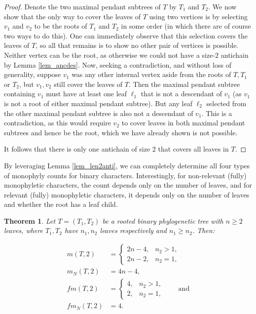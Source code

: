 \documentclass{amsart}
\newtheorem{theorem}{Theorem}
\theoremstyle{definition}
\begin{document}
\begin{proof}
 Denote the two maximal pendant subtrees of $T$ by $T_1$ and $T_2$. We now show that the only way to cover the leaves of $T$ using two vertices is by selecting $v_1$ and $v_2$ to be the roots of $T_1$ and $T_2$ in some order (in which there are of course two ways to do this). One can immediately observe that this selection covers the leaves of $T$, so all that remains is to show no other pair of vertices is possible. Neither vertex can be the root, as otherwise we could not have a size-$2$ antichain by Lemma \ref{lem_ancdes}. Now, seeking a contradiction, and without loss of generality, suppose $v_1$ was any other internal vertex aside from the roots of $T,T_1$ or $T_2$, but $v_1,v_2$ still cover the leaves of $T$. Then the maximal pendant subtree containing $v_1$ must have at least one leaf $\ell_1$ that is not a descendant of $v_1$ (as $v_1$ is not a root of either maximal pendant subtree). But any leaf $\ell_2$ selected from the other maximal pendant subtree is also not a descendant of $v_1$. This is a contradiction, as this would require $v_2$ to cover leaves in both maximal pendant subtrees and hence be the root, which we have already shown is not possible.

It follows that there is only one antichain of size $2$ that covers all leaves in $T$.
\end{proof}

By leveraging Lemma \ref{lem_len2anti}, we can completely determine all four types of monophyly counts for binary characters. Interestingly, for non-relevant (fully) monophyletic characters, the count depends only on the number of leaves, and for relevant (fully) monophyletic characters, it depends only on the number of leaves and whether the root has a leaf child.

\begin{theorem}\label{thm:binary.summary}
Let \(T=(T_1,T_2)\) be a rooted binary phylogenetic tree with
\(n\ge 2\) leaves, where \(T_1,T_2\) have \(n_1,n_2\) leaves respectively and \(n_1\ge n_2\). Then:

\begin{align*}
m(T,2) &=
\begin{cases}
2n-4,& n_2>1,\\
2n-2,& n_2=1,
\end{cases} \\
m_N(T,2)&=4n-4,\\
fm(T,2) &=
\begin{cases}
4,& n_2>1,\\
2,& n_2=1,
\end{cases} \qquad \text{and}\\
fm_N(T,2)&=4.
\end{align*}
\end{theorem}
\end{document}
